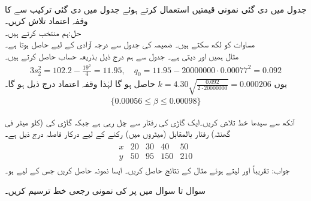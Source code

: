 \quad {}\\
جدول  میں دی گئی نمونی قیمتیں استعمال کرتے ہوئے جدول  میں دی گئی ترکیب سے  کا وقفہ اعتماد تلاش کریں۔\\
حل:\quad {}\quad ہم  منتخب کرتے ہیں۔\\
\quad مساوات  کو  لکھ سکتے ہیں۔ ضمیمہ  کی جدول  سے  درجہ آزادی کے لیے  حاصل ہوتا ہے۔\\
\quad مثال  ہمیں  اور   دیتی ہے۔ جدول  سے ہم درج ذیل بذریعہ حساب حاصل کرتے ہیں۔
\begin{align*}
3s_2^2=102.2-\frac{19^2}{4}=11.95, \quad q_0=11.95-\num{20000000}\cdot \num{0.00077}^2=0.092
\end{align*}
\quad یوں 
$k=4.30\sqrt{\frac{0.092}{2\cdot \num{20000000}}}=\num{0.000206}$
حاصل ہو گا لہٰذا وقفہ اعتماد درج ذیل ہو گا۔
\begin{align*}
\text{} \{\num{0.00056}\le \beta\le \num{0.00098}\}
\end{align*}

\quad
آنکھ سے سیدھا خط تلاش کریں۔ایک گاڑی  کی رفتار سے چل رہی ہے جبکہ گاڑی کی (کلو میٹر فی گھنٹہ) رفتار  بالمقابل (میٹروں میں) رکنے کے لیے درکار فاصلہ  درج ذیل ہے۔
\begin{align*}
\begin{array}{c|cccc}
x & 20&30&40&50\\
\hline
y&50&95&150&210
\end{array}
\end{align*}
جواب:\quad
تقریباً 
\quad
{} اور  لیتے ہوئے مثال  کے نتائج حاصل کریں۔
\quad
ایسا نمونہ حاصل کریں جس کے لیے  ہو۔

سوال  تا سوال   میں  پر  کی نمونی رجعی خط ترسیم کریں۔

